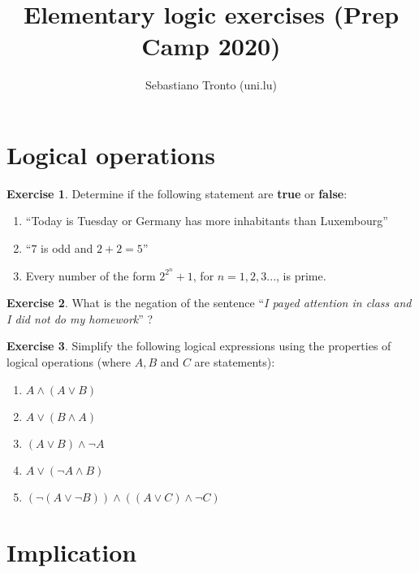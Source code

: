 \documentclass[a4paper,oneside]{article}
\author{Sebastiano Tronto (uni.lu)}
\title{Elementary logic exercises (Prep Camp 2020)}
\theoremstyle{definition} \newtheorem{exercise}{Exercise}[section]
\begin{document}
\maketitle

\section{Logical operations}

\begin{exercise}
  Determine if the following statement are \textbf{true} or \textbf{false}:
  \begin{enumerate}
    \item ``Today is Tuesday or Germany has more inhabitants than Luxembourg''
    \item ``$7$ is odd and $2+2=5$''
    \item Every number of the form $2^{2^n}+1$, for $n=1,2,3...$, is prime.
  \end{enumerate}
\end{exercise}

\begin{exercise}
  What is the negation of the sentence ``\emph{I payed attention in class and I
  did not do my homework}'' ?
\end{exercise}

\begin{exercise}
  Simplify the following logical expressions using the properties of logical
  operations (where $A,B$ and $C$ are statements):
  \begin{enumerate}
    \item $A\land(A\lor B)$
    \item $A\lor (B\land A)$
    \item $(A\lor B) \land \neg A$
    \item $A \lor (\neg A\land B)$
    \item $(\neg (A\lor \neg B))\land ((A\lor C) \land \neg C)$
  \end{enumerate}
\end{exercise}

\section{Implication}
\end{document}

